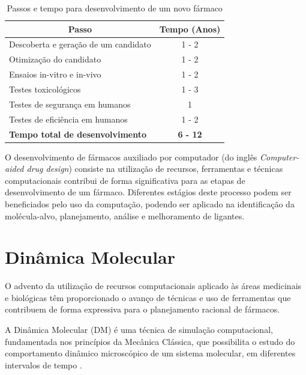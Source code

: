 \begin{table}[h]
	\caption{Passos e tempo para desenvolvimento de um novo fármaco \cite{kun92}}
	\label{tab:rddtempo}
	\centering
	\begin{tabular}{@{}lc@{}}
	\toprule
	\multicolumn{1}{c}{\textbf{Passo}}      & \textbf{Tempo (Anos)} \\ \midrule
	Descoberta e geração de um candidato    & 1 - 2                 \\
	Otimização do candidato                 & 1 - 2                 \\
	Ensaios in-vitro e in-vivo              & 1 - 2                 \\
	Testes toxicológicos                    & 1 - 3                 \\
	Testes de segurança em humanos          & 1                     \\
	Testes de eficiência em humanos         & 1 - 2                 \\ \midrule
	\textbf{Tempo total de desenvolvimento} & \textbf{6 - 12}       \\ \bottomrule
	\end{tabular}
\end{table}

O desenvolvimento de fármacos auxiliado por computador (do inglês \emph{Computer-aided drug design}) consiste na utilização de recursos, ferramentas e técnicas computacionais contribui de forma significativa para as etapas de desenvolvimento de um fármaco.  Diferentes estágios deste processo podem ser beneficiados pelo uso da computação, podendo ser aplicado na identificação da molécula-alvo, planejamento, análise e melhoramento de ligantes.


\section{Dinâmica Molecular}

O advento da utilização de recursos computacionais aplicado às áreas medicinais e biológicas têm proporcionado o avanço de técnicas e uso de ferramentas que contribuem de forma expressiva para o planejamento racional de fármacos.

A Dinâmica Molecular (DM) é uma técnica de simulação computacional, fundamentada nos princípios da Mecânica Clássica, que possibilita o estudo do comportamento dinâmico microscópico de um sistema molecular, em diferentes intervalos de tempo \cite{nam08}. 

